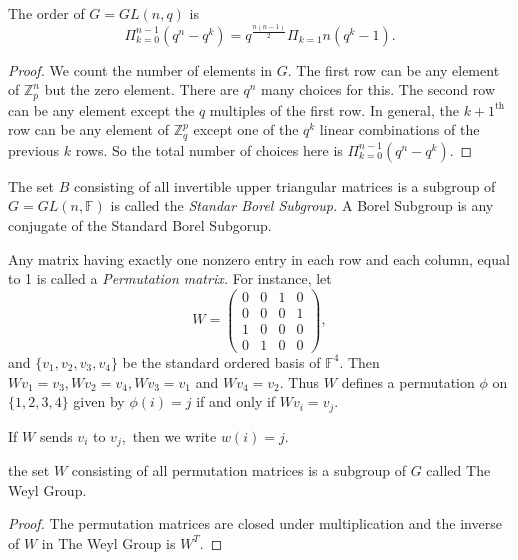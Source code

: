 \begin{proposition}[order of $GL(n, q)$]
	The order of $G = GL(n, q)$ is
	$$\Pi_{k=0}^{n-1} (q^n - q^k) = q^{ \frac{n(n-1)}{2}} \Pi_{k=1} n (q^k-1) .$$
\end{proposition}
\begin{proof}
	We count the number of elements in $G.$ The first row can be any element of $\mathbb{Z}_p^n$ but the zero element. There are $q^n$ many choices for this. The second row can be any element except the $q$ multiples of the first row. In general, the $k+1^{\text{th}}$ row can be any element of $\mathbb{Z}_q^p$ except one of the $q^k$ linear combinations of the previous $k$ rows. So the total number of choices here is $\Pi_{k=0}^{n-1} (q^n - q^k) .$ 
\end{proof}


\begin{definition}
	The set $B$ consisting of all invertible upper triangular matrices is a subgroup of $G = GL(n, \mathbb{F})$ is called the \emph{Standar Borel Subgroup.} A Borel Subgroup is any conjugate of the Standard Borel Subgorup.
\end{definition}

\begin{example}
	Any matrix having exactly one nonzero entry in each row and each column, equal to 1 is called a \emph{Permutation matrix.} For instance, let
	$$ W = \begin{pmatrix}
		 0  &  0 &  1 &  0  \\
		 0  &  0 &  0 &  1  \\
		 1  &  0 &  0 &  0  \\
		 0  &  1 &  0 &  0 
	\end{pmatrix} ,$$
	and $ \{ v_1, v_2, v_3, v_4 \}$ be the standard ordered basis of $\mathbb{F}^4.$ Then $W v_1 = v_3, W v_2 = v_4, W v_3 = v_1$ and $W v_4 = v_2.$ Thus $W$ defines a permutation $\phi$ on $ \{1,2,3,4\}$ given by
	$\phi(i) = j$ if and only if $W v_i = v_j.$
\end{example}

\begin{notation}
	If $W$ sends $v_i$ to $v_j,$ then we write $w(i) = j.$
\end{notation}

\begin{proposition}
	the set $W$ consisting of all permutation matrices is a subgroup of $G$ called The Weyl Group.
\end{proposition}
\begin{proof}
	The permutation matrices are closed under multiplication and the inverse of $W$ in The Weyl Group is $W^T.$
\end{proof}

